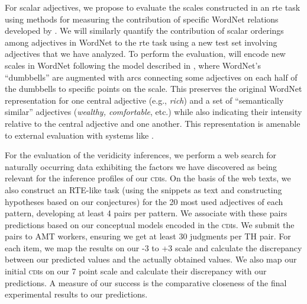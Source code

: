 \documentclass[10pt]{article}
\begin{document}
For scalar adjectives, we propose to evaluate the scales constructed in an {\sc rte} task using methods for measuring the contribution of specific WordNet relations developed by \cite{clark2008using,clark2008augmenting,clark2007role}. 
We will similarly quantify the contribution of scalar orderings among adjectives in WordNet to the {\sc rte} task using a new test set involving adjectives that we have analyzed. 
To perform the evaluation, will encode new scales in WordNet following the model described in 
\cite{sheinmanetal2013}, where WordNet's ``dumbbells'' are augmented with arcs connecting some  adjectives on each half of the dumbbells to specific 
points on the scale. This preserves the original WordNet representation for one central 
adjective (e.g., \emph{rich}) and a set of ``semantically similar'' adjectives (\emph{wealthy, comfortable}, etc.) while also indicating their intensity relative to the central adjective and one another.
This representation is amenable to external evaluation with systems like \cite{clark2007role}.



For the evaluation of the veridicity inferences, we perform  a web search for naturally occurring data exhibiting the factors we have discovered as being relevant for the inference profiles of our \textsc{cdi}s. On the basis of the web texts, we also construct an RTE-like task (using the snippets as {\sc text} and constructing {\sc hypotheses} based on our conjectures) for the 20 most used adjectives of each pattern, developing at least 4 pairs per pattern. We associate with these pairs predictions based on our conceptual models encoded in the \textsc{cdi}s. We submit the pairs to AMT workers, ensuring we get at least 30 judgments per TH pair. For each item, we map the results on our -3 to +3 scale and calculate the discrepancy between our predicted values and the actually obtained values. We also map our initial \textsc{cdi}s on our 7 point scale and calculate their discrepancy with our predictions. A measure of our success is the comparative closeness of the final experimental results to our predictions. 
\end{document}
